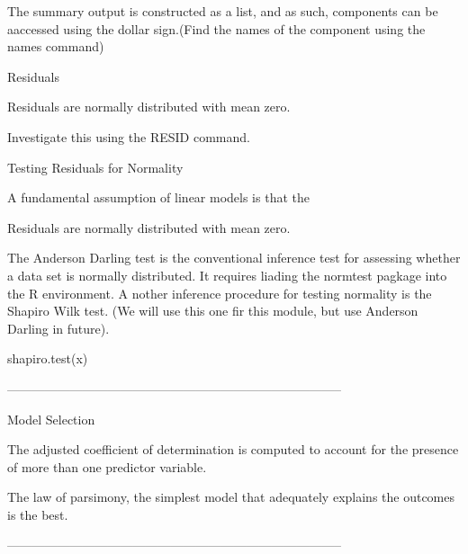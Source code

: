 The summary output is constructed as a list, and as such, components can be aaccessed using the dollar sign.(Find the names of the component using the names command)

Residuals

Residuals are normally distributed with mean zero. 

Investigate this using the RESID command.

Testing Residuals for Normality


A fundamental assumption of linear models is that the

Residuals are normally distributed with mean zero.


The Anderson Darling test is the conventional inference test for assessing whether a data set is normally distributed. It requires liading the normtest pagkage into the R environment. A nother inference procedure for testing normality is the Shapiro Wilk test. (We will use this one fir this module, but use Anderson Darling in future).


shapiro.test(x)





--------------------------------------------------------------------------------


Model Selection


The adjusted coefficient of determination is computed to account for the presence of more than one predictor variable.


The law of parsimony, the simplest model that adequately explains the outcomes is the best.




--------------------------------------------------------------------------------


